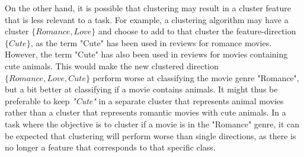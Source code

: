 On the other hand, it is possible that  clustering may result in a cluster feature that is less relevant to a task. For example, a clustering algorithm may have a cluster $\{Romance, Love\}$ and choose to add to that cluster the feature-direction $\{Cute\}$, as the term "Cute"  has been used in reviews for romance movies. However, the term "Cute" has also been used in reviews for movies containing cute animals. This would make the new clustered direction $\{Romance, Love, Cute\}$ perform worse at classifying the movie genre "Romance", but a bit better at classifying if a movie contains animals. It might thus be preferable to keep \textit{"Cute"} in a separate cluster that represents  animal movies rather than a cluster that represents romantic movies with cute animals. In a task where the objective is to cluster if a movie is in the "Romance" genre, it can be expected that clustering will perform worse than single directions, as there is no longer a feature that  corresponds to that specific class. 







